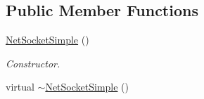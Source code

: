 \subsection*{Public Member Functions}
\begin{DoxyCompactItemize}
\item 
\hypertarget{class_net_socket_simple_a80a430ef1223cbe49d20182673c93efc}{
\hyperlink{class_net_socket_simple_a80a430ef1223cbe49d20182673c93efc}{NetSocketSimple} ()}
\label{class_net_socket_simple_a80a430ef1223cbe49d20182673c93efc}

\begin{DoxyCompactList}\small\item\em Constructor. \item\end{DoxyCompactList}\item 
\hypertarget{class_net_socket_simple_a83d123c03cf3727aaf9f99bfe79328bc}{
virtual \hyperlink{class_net_socket_simple_a83d123c03cf3727aaf9f99bfe79328bc}{$\sim$NetSocketSimple} ()}
\label{class_net_socket_simple_a83d123c03cf3727aaf9f99bfe79328bc}


\end{DoxyCompactItemize}
